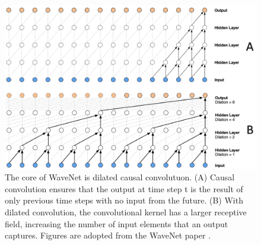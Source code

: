\documentclass[sigconf,authorversion]{acmart}
\begin{document}
\begin{figure}[h]
  \centering
  \includegraphics[width=\linewidth]{causal_conv.png}
  \caption{The core of WaveNet is dilated causal convolutuon. (A) Causal convolution 
  ensures that the output at time step t is the result of only previous time steps 
  with no input from the future. (B) With dilated convolution, the convolutional
  kernel has a larger receptive field, increasing the number of input elements
  that an output captures. Figures are adopted from the WaveNet paper \cite{oord_wavenet_2016}.}
  \label{causal_conv}
\end{figure}
\end{document}
